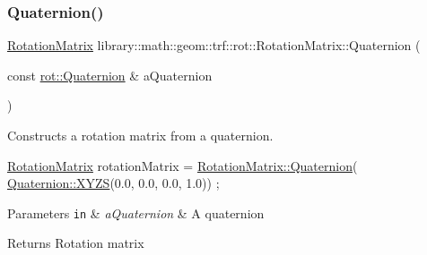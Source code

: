 \subsubsection{\texorpdfstring{Quaternion()}{Quaternion()}}
{\footnotesize\ttfamily \hyperlink{classlibrary_1_1math_1_1geom_1_1trf_1_1rot_1_1_rotation_matrix}{Rotation\+Matrix} library\+::math\+::geom\+::trf\+::rot\+::\+Rotation\+Matrix\+::\+Quaternion (\begin{DoxyParamCaption}\item[{const \hyperlink{classlibrary_1_1math_1_1geom_1_1trf_1_1rot_1_1_quaternion}{rot\+::\+Quaternion} \&}]{a\+Quaternion }\end{DoxyParamCaption})\hspace{0.3cm}{\ttfamily [static]}}



Constructs a rotation matrix from a quaternion. 


\begin{DoxyCode}
\hyperlink{classlibrary_1_1math_1_1geom_1_1trf_1_1rot_1_1_rotation_matrix_a667d2c05aa5b0cc88775938d11164cdc}{RotationMatrix} rotationMatrix = \hyperlink{classlibrary_1_1math_1_1geom_1_1trf_1_1rot_1_1_rotation_matrix_aba9c64b7b25d9819358c0caba6c388e2}{RotationMatrix::Quaternion}(
      \hyperlink{classlibrary_1_1math_1_1geom_1_1trf_1_1rot_1_1_quaternion_afff9523c7dcbfbbc521736121e62ad41}{Quaternion::XYZS}(0.0, 0.0, 0.0, 1.0)) ;
\end{DoxyCode}



\begin{DoxyParams}[1]{Parameters}
\mbox{\tt in}  & {\em a\+Quaternion} & A quaternion \\
\hline
\end{DoxyParams}
\begin{DoxyReturn}{Returns}
Rotation matrix 
\end{DoxyReturn}
\mbox{\label{classlibrary_1_1math_1_1geom_1_1trf_1_1rot_1_1_rotation_matrix_aeace0bbd2b718443514a5f10aca3a904}} 
